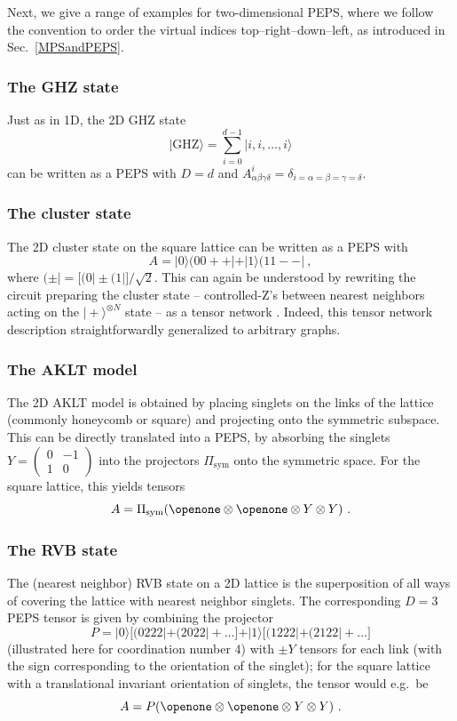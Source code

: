 \documentclass[rmp,aps,reprint,superscriptaddress,nobalancelastpage]{revtex4-1}
\newcommand{\ket}[1]{\vert#1\rangle}
\begin{document}
Next, we give a range of examples for two-dimensional PEPS, where we follow the convention to order the virtual indices top--right--down--left, as introduced in Sec.~\ref{MPSandPEPS}.

\subsubsection{The GHZ state\label{sec:examples:2D:GHZ}} Just as in 1D, the 2D GHZ state
\[
    \ket{\mathrm{GHZ}}=\sum_{i=0}^{d-1}\ket{i,i,\dots,i}
\]
can be written as a PEPS with $D=d$ and $A^i_{\alpha\beta\gamma\delta}=\delta_{i=\alpha=\beta=\gamma=\delta}$.


\subsubsection{The cluster state} The 2D cluster state \cite{raussendorf:cluster-short} on the square lattice can be written as a PEPS with
\[
    A=\ket0(00++|+\ket{1}(11--|\ ,
\]
where $(\pm|=\big[(0|\pm(1|\big]/\sqrt{2}$.
This can again be understood by rewriting the circuit preparing the cluster state -- controlled-Z's between nearest neighbors acting on the $\ket{+}^{\otimes N}$ state -- as a tensor network \cite{verstraete:mbc-peps}. Indeed, this tensor network description straightforwardly generalized to arbitrary graphs.



\subsubsection{The AKLT model}
The 2D AKLT model \cite*{affleck:aklt-cmp} is obtained by placing singlets on the links of the lattice (commonly honeycomb or square) and projecting onto the symmetric subspace. This can be directly translated into a PEPS, by absorbing the singlets $Y=\left(\begin{smallmatrix}0&-1\\1&0\end{smallmatrix}\right)$ into the projectors $\Pi_\mathrm{sym}$ onto the symmetric space. For the square lattice, this yields tensors
\[
    A= \Pi_\mathrm{sym}(\openone\otimes\openone\otimes Y\otimes Y)\ .
\]



\subsubsection{The RVB state} The (nearest neighbor) RVB state on a 2D lattice is the superposition of all ways of covering the lattice with nearest neighbor singlets. The corresponding $D=3$ PEPS tensor \cite{verstraete:comp-power-of-peps} is given by combining the projector
\[
    P = \ket0\big[(0222|+(2022|+\dots\big] +
    \ket1\big[(1222|+(2122|+\dots\big]
\] (illustrated here for coordination number $4$) with $\pm Y$ tensors for each link (with the sign corresponding to the orientation of the singlet); for the square lattice with a translational invariant orientation of singlets, the tensor would e.g.\ be
\[
    A=P(\openone\otimes\openone\otimes Y\otimes Y)\ .
\]
\end{document}
